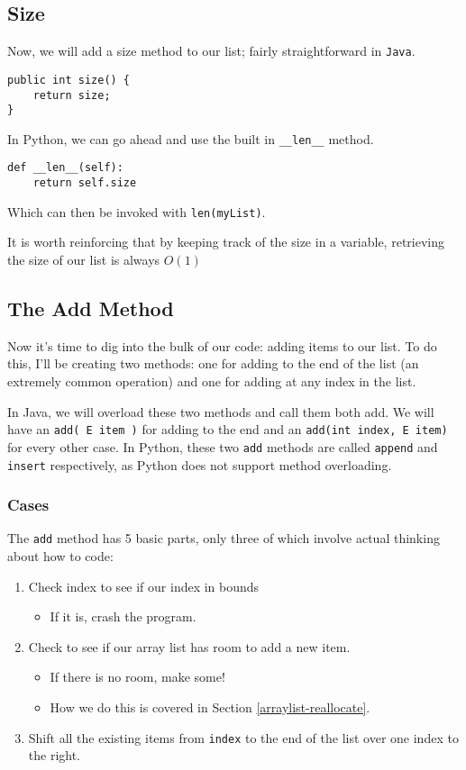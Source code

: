 \subsection{Size}
Now, we will add a size method to our list; fairly straightforward in \texttt{Java}.

\begin{verbatim}
public int size() {  
	return size;
}
\end{verbatim}

In Python, we can go ahead and use the built in \texttt{\_\_len\_\_} method.

\begin{verbatim}
def __len__(self):
	return self.size
\end{verbatim}

Which can then be invoked with \texttt{len(myList)}.


It is worth reinforcing that by keeping track of the size in a variable, retrieving the size of our list is always $O(1)$

\subsection{The Add Method}
Now it's time to dig into the bulk of our code: adding items to our list.
To do this, I'll be creating two methods:  one for adding to the end of the list (an extremely common operation) and one for adding at any index in the list.


In Java, we will overload these two methods and call them both add.  We will have an \texttt{add( E item )} for adding to the end and an \texttt{add(int index, E item)} for every other case.  
In Python, these two \texttt{add} methods are called \texttt{append} and \texttt{insert} respectively, as Python does not support method overloading.




\subsubsection{Cases}
The \texttt{add} method has 5 basic parts, only three of which involve actual thinking about how to code:
\begin{enumerate}
	\item Check index to see if our index in bounds
	\begin{itemize}
		\item If it is, crash the program.
	\end{itemize}
	\item Check to see if our array list has room to add a new item.
	\begin{itemize}
		\item If there is no room, make some!
		\item How we do this is covered in Section \ref{arraylist-reallocate}.
	\end{itemize}
	\item Shift all the existing items from \texttt{index} to the end of the list over one index to the right.
\end{enumerate}

